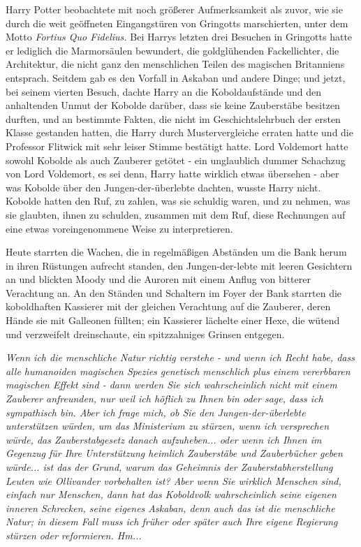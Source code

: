 Harry Potter beobachtete mit noch größerer Aufmerksamkeit als zuvor, wie sie
durch die weit geöffneten Eingangstüren von Gringotts marschierten, unter dem
Motto \emph{Fortius Quo Fidelius.} Bei Harrys letzten drei Besuchen in Gringotts
hatte er lediglich die Marmorsäulen bewundert, die goldglühenden Fackellichter,
die Architektur, die nicht ganz den menschlichen Teilen des magischen
Britanniens entsprach. Seitdem gab es den Vorfall in Askaban und andere Dinge;
und jetzt, bei seinem vierten Besuch, dachte Harry an die Koboldaufstände und
den anhaltenden Unmut der Kobolde darüber, dass sie keine Zauberstäbe besitzen
durften, und an bestimmte Fakten, die nicht im Geschichtslehrbuch der ersten
Klasse gestanden hatten, die Harry durch Mustervergleiche erraten hatte und die
Professor Flitwick mit sehr leiser Stimme bestätigt hatte. Lord Voldemort hatte
sowohl Kobolde als auch Zauberer getötet - ein unglaublich dummer Schachzug von
Lord Voldemort, es sei denn, Harry hatte wirklich etwas übersehen - aber was
Kobolde über den Jungen-der-überlebte dachten, wusste Harry nicht. Kobolde
hatten den Ruf, zu zahlen, was sie schuldig waren, und zu nehmen, was sie
glaubten, ihnen zu schulden, zusammen mit dem Ruf, diese Rechnungen auf eine
etwas voreingenommene Weise zu interpretieren.

Heute starrten die Wachen, die in regelmäßigen Abständen um die Bank herum in
ihren Rüstungen aufrecht standen, den Jungen-der-lebte mit leeren Gesichtern an
und blickten Moody und die Auroren mit einem Anflug von bitterer Verachtung an.
An den Ständen und Schaltern im Foyer der Bank starrten die koboldhaften
Kassierer mit der gleichen Verachtung auf die Zauberer, deren Hände sie mit
Galleonen füllten; ein Kassierer lächelte einer Hexe, die wütend und verzweifelt
dreinschaute, ein spitzzahniges Grinsen entgegen.

\emph{Wenn ich die menschliche Natur richtig verstehe - und wenn ich Recht habe,
dass alle humanoiden magischen Spezies genetisch menschlich plus einem
vererbbaren magischen Effekt sind - dann werden Sie sich wahrscheinlich nicht
mit einem Zauberer anfreunden, nur weil ich höflich zu Ihnen bin oder sage, dass
ich sympathisch bin. Aber ich frage mich, ob Sie den Jungen-der-überlebte
unterstützen würden, um das Ministerium zu stürzen, wenn ich versprechen würde,
das Zauberstabgesetz danach aufzuheben... oder wenn ich Ihnen im Gegenzug für
Ihre Unterstützung heimlich Zauberstäbe und Zauberbücher geben würde... ist das
der Grund, warum das Geheimnis der Zauberstabherstellung Leuten wie Ollivander
vorbehalten ist? Aber wenn Sie wirklich Menschen sind, einfach nur Menschen,
dann hat das Koboldvolk wahrscheinlich seine eigenen inneren Schrecken, seine
eigenes Askaban, denn auch das ist die menschliche Natur; in diesem Fall muss
ich früher oder später auch Ihre eigene Regierung stürzen oder reformieren.
Hm...}

